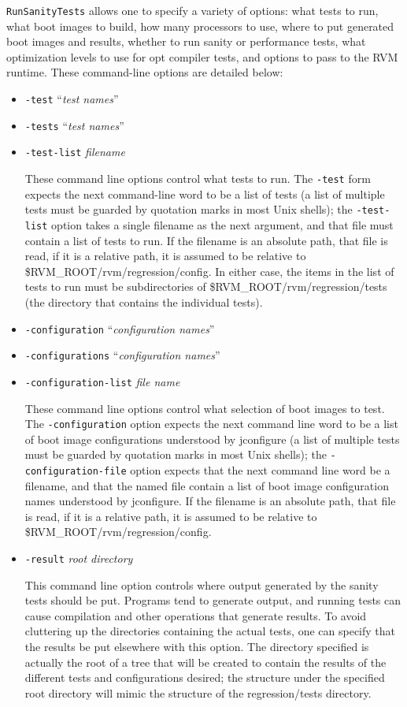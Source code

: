  {\tt{RunSanityTests}} allows one to specify a variety of options:
what tests to run, what boot images to build, how many processors to
use, where to put generated boot images and results, whether to run
sanity or performance tests, what optimization levels to use for opt
compiler tests, and options to pass to the RVM runtime.  These
command-line options are detailed below:

\begin{itemize}
\item{\tt{-test}} ``{\em{test names}}''
\item{\tt{-tests}} ``{\em{test names}}''
\item{\tt{-test-list}} {\em{filename}}

 These command line options control what tests to run.  The
{\tt{-test}} form expects the next command-line word to be a list
of tests (a list of multiple tests must be guarded by quotation marks
in most Unix shells); the {\tt{-test-list}} option takes a single
filename as the next argument, and that file must contain a list of
tests to run.  If the filename is an absolute path, that file is read,
if it is a relative path, it is assumed to be relative to
\$RVM\_ROOT/rvm/regression/config.  In either case, the items in the
list of tests to run must be subdirectories of
\$RVM\_ROOT/rvm/regression/tests (the directory that contains the
individual tests).

\item{\tt{-configuration}} ``{\em{configuration names}}''
\item{\tt{-configurations}} ``{\em{configuration names}}''
\item{\tt{-configuration-list}} {\em{file name}}

 These command line options control what selection of boot images to
test.  The {\tt{-configuration}} option expects the next command
line word to be a list of boot image configurations understood by
jconfigure (a list of multiple tests must be guarded by quotation
marks in most Unix shells); the {\tt{-configuration-file}} option
expects that the next command line word be a filename, and that the
named file contain a list of boot image configuration names understood
by jconfigure.  If the filename is an absolute path, that file is
read, if it is a relative path, it is assumed to be relative to
\$RVM\_ROOT/rvm/regression/config.

\item{\tt{-result}} {\em root directory}

 This command line option controls where output generated by the
sanity tests should be put.  Programs tend to generate output, and
running tests can cause compilation and other operations that generate
results.  To avoid cluttering up the directories containing the actual
tests, one can specify that the results be put elsewhere with this
option.  The directory specified is actually the root of a tree that
will be created to contain the results of the different tests and
configurations desired; the structure under the specified root
directory will mimic the structure of the regression/tests directory. 


\end{itemize}
